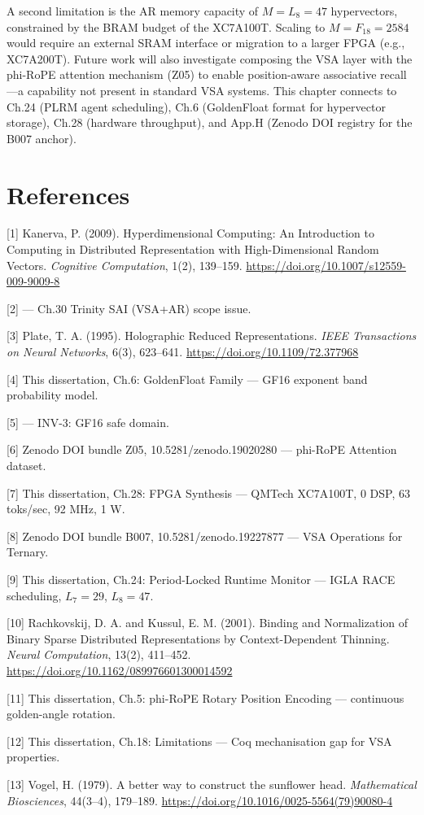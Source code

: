 A second limitation is the AR memory capacity of
\(M = L_8 = 47\) hypervectors, constrained by the
BRAM budget of the XC7A100T. Scaling to
\(M = F_{18} = 2584\) would require an external
SRAM interface or migration to a larger FPGA
(e.g., XC7A200T). Future work will also
investigate composing the VSA layer with the
phi-RoPE attention mechanism (Z05) to enable
position-aware associative recall---a capability
not present in standard VSA systems. This chapter
connects to Ch.24 (PLRM agent scheduling), Ch.6
(GoldenFloat format for hypervector storage),
Ch.28 (hardware throughput), and App.H (Zenodo DOI
registry for the B007 anchor).

\section{References}\label{fa_30:references}

[1] Kanerva, P. (2009). Hyperdimensional
Computing: An Introduction to Computing in
Distributed Representation with High-Dimensional
Random Vectors. \emph{Cognitive Computation},
1(2), 139--159.
\url{https://doi.org/10.1007/s12559-009-9009-8}

[2]  --- Ch.30
Trinity SAI (VSA+AR) scope issue.

[3] Plate, T. A. (1995). Holographic Reduced
Representations. \emph{IEEE Transactions on Neural
Networks}, 6(3), 623--641.
\url{https://doi.org/10.1109/72.377968}

[4] This dissertation, Ch.6: GoldenFloat
Family --- GF16 exponent band probability model.

[5]
--- INV-3: GF16 safe domain.

[6] Zenodo DOI bundle Z05,
10.5281/zenodo.19020280 --- phi-RoPE Attention
dataset.

[7] This dissertation, Ch.28: FPGA Synthesis
--- QMTech XC7A100T, 0 DSP, 63 toks/sec, 92 MHz, 1
W.

[8] Zenodo DOI bundle B007,
10.5281/zenodo.19227877 --- VSA Operations for
Ternary.

[9] This dissertation, Ch.24: Period-Locked
Runtime Monitor --- IGLA RACE scheduling,
\(L_7=29\), \(L_8=47\).

[10] Rachkovskij, D. A. and Kussul, E. M.
(2001). Binding and Normalization of Binary Sparse
Distributed Representations by Context-Dependent
Thinning. \emph{Neural Computation}, 13(2),
411--452.
\url{https://doi.org/10.1162/089976601300014592}

[11] This dissertation, Ch.5: phi-RoPE Rotary
Position Encoding --- continuous golden-angle
rotation.

[12] This dissertation, Ch.18: Limitations ---
Coq mechanisation gap for VSA properties.

[13] Vogel, H. (1979). A better way to
construct the sunflower head. \emph{Mathematical
Biosciences}, 44(3--4), 179--189.
\url{https://doi.org/10.1016/0025-5564(79)90080-4}

